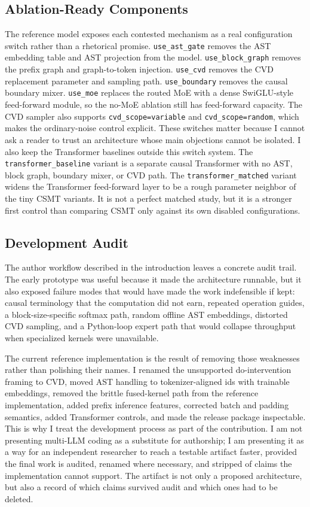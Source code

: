 \documentclass[10pt]{article}
\begin{document}
\subsection{Ablation-Ready Components}

The reference model exposes each contested mechanism as a real configuration
switch rather than a rhetorical promise.  \texttt{use\_ast\_gate} removes the AST
embedding table and AST projection from the model.  \texttt{use\_block\_graph}
removes the prefix graph and graph-to-token injection.  \texttt{use\_cvd}
removes the CVD replacement parameter and sampling path.  \texttt{use\_boundary}
removes the causal boundary mixer.  \texttt{use\_moe} replaces the routed MoE
with a dense SwiGLU-style feed-forward module, so the no-MoE ablation still has
feed-forward capacity.  The CVD sampler also supports
\texttt{cvd\_scope=variable} and \texttt{cvd\_scope=random}, which makes the
ordinary-noise control explicit.  These switches matter because I cannot ask a
reader to trust an architecture whose main objections cannot be isolated.
I also keep the Transformer baselines outside this switch system.  The
\texttt{transformer\_baseline} variant is a separate causal Transformer with no
AST, block graph, boundary mixer, or CVD path.  The
\texttt{transformer\_matched} variant widens the Transformer feed-forward layer
to be a rough parameter neighbor of the tiny CSMT variants.  It is not a perfect
matched study, but it is a stronger first control than comparing CSMT only
against its own disabled configurations.

\subsection{Development Audit}

The author workflow described in the introduction leaves a concrete audit trail.
The early prototype was useful because it made the architecture runnable, but it
also exposed failure modes that would have made the work indefensible if kept:
causal terminology that the computation did not earn, repeated operation guides,
a block-size-specific softmax path, random offline AST embeddings, distorted CVD
sampling, and a Python-loop expert path that would collapse throughput when
specialized kernels were unavailable.

The current reference implementation is the result of removing those weaknesses
rather than polishing their names.  I renamed the unsupported do-intervention
framing to CVD, moved AST handling to tokenizer-aligned ids with trainable
embeddings, removed the brittle fused-kernel path from the reference
implementation, added prefix inference features, corrected batch and padding
semantics, added Transformer controls, and made the release package inspectable.
This is why I treat the development process as part of the contribution.  I am
not presenting multi-LLM coding as a substitute for authorship; I am presenting
it as a way for an independent researcher to reach a testable artifact faster,
provided the final work is audited, renamed where necessary, and stripped of
claims the implementation cannot support.  The artifact is not only a proposed
architecture, but also a record of which claims survived audit and which ones
had to be deleted.
\end{document}
